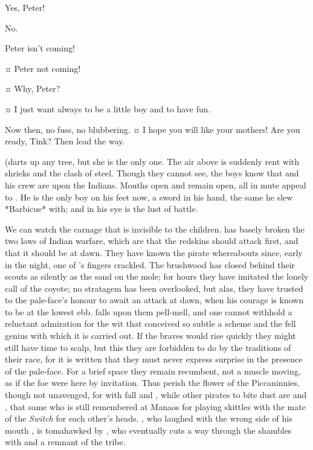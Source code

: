 \begin{drama}
\wendyspeaks
Yes, Peter!

\peterspeaks
No.


\wendyspeaks
Peter isn’t coming!


\johnspeaks {}¤
Peter not coming!

\tootlesspeaks {}¤
Why, Peter?

\peterspeaks {}¤
I just want always to be a little boy and to have fun.


\speakercontinues
Now then, no fuss, no blubbering.
¤
I hope you will like your mothers!
Are you ready, Tink?
Then lead the way.

\begin{stagedir}
(\tink darts up any tree, but she is the only one.
The air above is suddenly rent with shrieks and the clash of steel.
Though they cannot see, the boys know that \hook and his crew are upon the Indians.
Mouths open and remain open, all in mute appeal to \peter.
He is the only boy on his feet now, a sword in his hand, the same he slew *Barbicue* with;
and in his eye is the lust of battle.

We can watch the carnage that is invisible to the children.
\hook has basely broken the two laws of Indian warfare,
which are that the redskins should attack first, and that it should be at dawn.
They have known the pirate whereabouts since, early in the night, one of \smee’s fingers crackled.
The brushwood has closed behind their scouts as silently as the sand on the mole;
for hours they have imitated the lonely call of the coyote;
no stratagem has been overlooked, but alas, they have trusted to the pale‐face’s honour to await an attack at dawn,
when his courage is known to be at the lowest ebb.
\hook falls upon them pell‐mell,
and one cannot withhold a reluctant admiration for the wit that conceived so subtle a scheme
and the fell genius with which it is carried out.
If the braves would rise quickly they might still have time to scalp,
but this they are forbidden to do by the traditions of their race,
for it is written that they must never express surprise in the presence of the pale‐face.
For a brief space they remain recumbent, not a muscle moving, as if the foe were here by invitation.
Thus perish the flower of the Piccaninnies, though not unavenged,
for with  fall  and ,
while other pirates to bite dust are  and ,
that same  who is still remembered at Manaos
for playing skittles with the mate of the \emph{Switch} for each other’s heads.
, who laughed with the wrong side of his mouth ,
is tomahawked by \panther,
who eventually cuts a way through the shambles with \tigerlily and a remnant of the tribe.


\end{stagedir}
\end{drama}

